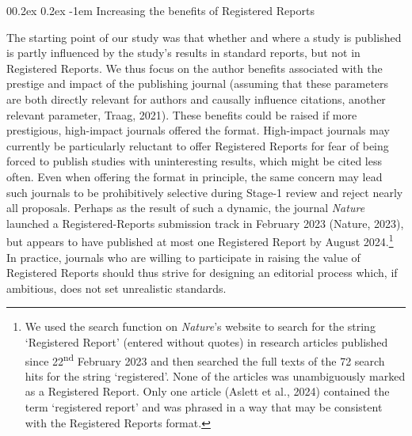 \documentclass[
  ,man,mask,floatsintext]{apa6}
\makeatletter
\let\oldparagraph\paragraph
\renewcommand{\paragraph}[1]{\oldparagraph{#1}\mbox{}}
\renewcommand{\paragraph}{\@startsection{paragraph}{4}{\parindent}%
  {0\baselineskip \@plus 0.2ex \@minus 0.2ex}%
  {-1em}%
  {\normalfont\normalsize\bfseries\itshape\typesectitle}}
\makeatother
\begin{document}
\par\vspace{0.2\baselineskip}

\hypertarget{increasing-the-benefits-of-registered-reports}{%
\paragraph{Increasing the benefits of Registered Reports}\label{increasing-the-benefits-of-registered-reports}}

The starting point of our study was that
whether and where a study is published is partly influenced by the study's results in standard reports, but not in Registered Reports.
We thus focus on the author benefits associated with the prestige and impact of the publishing journal (assuming that these parameters are both directly relevant for authors and causally influence citations, another relevant parameter, Traag, 2021).
These benefits could be raised if more prestigious, high-impact journals offered the format.
High-impact journals may currently be particularly reluctant to offer
Registered Reports for fear of being forced to publish studies with uninteresting results, which might be cited less often.
Even when offering the format in principle, the same concern may lead such journals to be prohibitively selective during Stage-1 review and reject nearly all proposals.
Perhaps as the result of such a dynamic, the journal \emph{Nature} launched a Registered-Reports submission track in February 2023 (Nature, 2023), but appears to have published at most one Registered Report by August 2024.\footnote{We used the search function on \emph{Nature}'s website to search for the string `Registered Report' (entered without quotes) in research articles published since 22\textsuperscript{nd} February 2023 and then searched the full texts of the 72 search hits for the string `registered'. None of the articles was unambiguously marked as a Registered Report. Only one article (Aslett et al., 2024) contained the term `registered report' and was phrased in a way that may be consistent with the Registered Reports format.}
In practice, journals who are willing to participate in raising the value of Registered Reports should thus strive for designing an editorial process which, if ambitious, does not set unrealistic standards.
\end{document}
